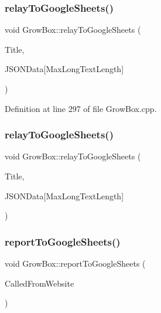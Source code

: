 \subsubsection{\texorpdfstring{relay\+To\+Google\+Sheets()}{relayToGoogleSheets()}\hspace{0.1cm}{\footnotesize\ttfamily [1/2]}}
{\footnotesize\ttfamily void Grow\+Box\+::relay\+To\+Google\+Sheets (\begin{DoxyParamCaption}\item[{const \+\_\+\+\_\+\+Flash\+String\+Helper $\ast$}]{Title,  }\item[{char($\ast$)}]{J\+S\+O\+N\+Data\mbox{[}\+Max\+Long\+Text\+Length\mbox{]} }\end{DoxyParamCaption})}



Definition at line 297 of file Grow\+Box.\+cpp.

\mbox{\label{class_grow_box_aac4b1240925ce9791d1a1c804839d345}} 
\subsubsection{\texorpdfstring{relay\+To\+Google\+Sheets()}{relayToGoogleSheets()}\hspace{0.1cm}{\footnotesize\ttfamily [2/2]}}
{\footnotesize\ttfamily void Grow\+Box\+::relay\+To\+Google\+Sheets (\begin{DoxyParamCaption}\item[{const \+\_\+\+\_\+\+Flash\+String\+Helper $\ast$}]{Title,  }\item[{char($\ast$)}]{J\+S\+O\+N\+Data\mbox{[}\+Max\+Long\+Text\+Length\mbox{]} }\end{DoxyParamCaption})}

\mbox{\label{class_grow_box_a8070acc30dff79b90ff5d813fab1921f}} 
\subsubsection{\texorpdfstring{report\+To\+Google\+Sheets()}{reportToGoogleSheets()}\hspace{0.1cm}{\footnotesize\ttfamily [1/2]}}
{\footnotesize\ttfamily void Grow\+Box\+::report\+To\+Google\+Sheets (\begin{DoxyParamCaption}\item[{bool}]{Called\+From\+Website }\end{DoxyParamCaption})}

